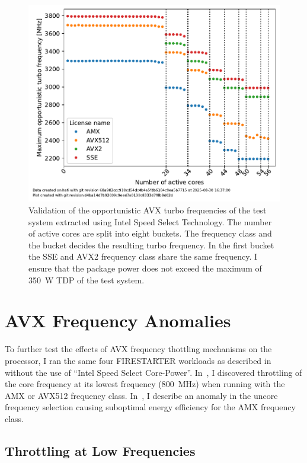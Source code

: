 \begin{figure}[]
    \centering
    \includegraphics[width=0.8\columnwidth]{fig/avx-frequency-license-bands-validation/validate-avx-frequency-license-bands.pdf}
    \caption{\label{fig:validated-p0n-frequencies}Validation of the opportunistic AVX turbo frequencies of the test system extracted using Intel Speed Select Technology.
    The number of active cores are split into eight buckets. The frequency class and the bucket decides the resulting turbo frequency.
    In the first bucket the SSE and AVX2 frequency class share the same frequency. I ensure that the package power does not exceed the maximum of \SI{350}{\watt} TDP of the test system.}
\end{figure}

\section{AVX Frequency Anomalies}
\label{sec:avx-anomalies}

To further test the effects of AVX frequency thottling mechanisms on the processor, I ran the same four FIRESTARTER workloads as described in~ without the use of ``Intel Speed Select Core-Power''.
In~, I discovered throttling of the core frequency at its lowest frequency (\SI{800}{\MHz}) when running with the AMX or AVX512 frequency class.
In~, I describe an anomaly in the uncore frequency selection causing suboptimal energy efficiency for the AMX frequency class.

\subsection{Throttling at Low Frequencies}
\label{sec:avx-anomalies-low-freq}

